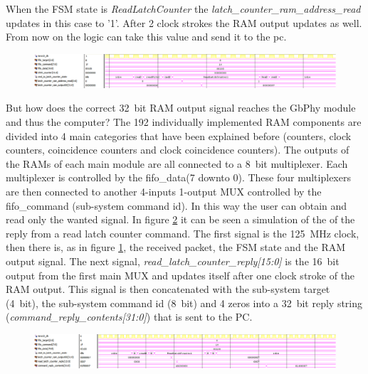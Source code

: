 \noindent When the FSM state is \textit{ReadLatchCounter} the \textit{latch\_counter\_ram\_address\_read} updates in this case to '1'. After 2 clock strokes the RAM output updates as well. From now on the logic can take this value and send it to the pc. 
\begin{figure}[H]
	\centering
	\includegraphics[width=1.0\linewidth]{IMG/ch4/LATCHsimulations/READLATCH}
	\caption{}
	\label{fig:readlatch}
\end{figure}
\noindent But how does the correct 32~bit RAM output signal reaches the GbPhy module and thus the computer?
The 192 individually implemented RAM components are divided into 4 main categories that have been explained before (counters, clock counters, coincidence counters and clock coincidence counters).
The outputs of the RAMs of each main module are all connected to a 8~bit multiplexer. Each multiplexer is controlled by the fifo\_data(7 downto 0). These four multiplexers are then connected to another 4-inputs 1-output MUX controlled by the fifo\_command (sub-system command id). In this way the user can obtain and read only the wanted signal.
In figure \ref{fig:replylatch} it can be seen a simulation of the of the reply from a read latch counter command.
The first signal is the 125~MHz clock, then there is, as in figure \ref{fig:readlatch}, the received packet, the FSM state and the RAM output signal.
The next signal, \textit{read\_latch\_counter\_reply[15:0]} is the 16~bit output from the first main MUX and updates itself after one clock stroke of the RAM output.
This signal is then concatenated with the sub-system target (4~bit), the sub-system command id (8~bit) and 4 zeros into a 32~bit reply string (\textit{command\_reply\_contents[31:0]}) that is sent to the PC. 
\begin{figure}[H]
	\centering
	\includegraphics[width=1.0\linewidth]{IMG/ch4/LATCHsimulations/REPLYLATCH}
	\caption{}
	\label{fig:replylatch}
\end{figure}
